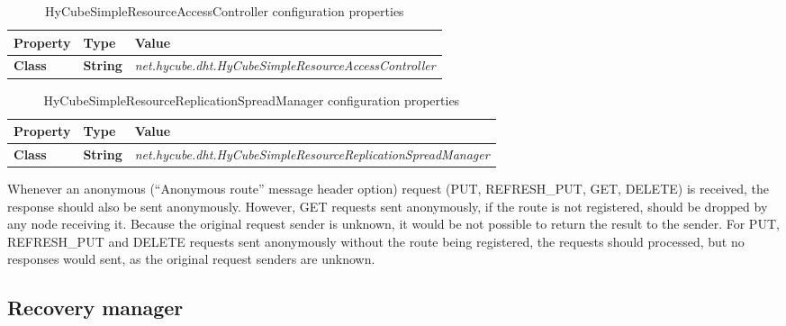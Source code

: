 \begin{table}
\scriptsize
\begin{center}
\begin{tabular}{p{5cm} p{1.5cm} p{8.0cm}}
	\hline
	\textbf{Property}						& \textbf{Type}					& \textbf{Value}					\\[1mm]
    \hline
	\textbf{Class}							& \textbf{String}				& \textit{net.hycube.dht.HyCubeSimpleResourceAccessController}									\\[1.5mm]	
    \hline
\end{tabular}
\end{center}
\caption{HyCubeSimpleResourceAccessController configuration properties}
\label{tab:libHyCubeSimpleResourceAccessController}
\end{table}

\begin{table}
\scriptsize
\begin{center}
\begin{tabular}{p{5cm} p{1.5cm} p{8.0cm}}
	\hline
	\textbf{Property}						& \textbf{Type}					& \textbf{Value}					\\[1mm]
    \hline
	\textbf{Class}							& \textbf{String}				& \textit{net.hycube.dht.HyCubeSimpleResourceReplicationSpreadManager}									\\[1.5mm]	
    \hline
\end{tabular}
\end{center}
\caption{HyCubeSimpleResourceReplicationSpreadManager configuration properties}
\label{tab:libHyCubeSimpleResourceReplicationSpreadManager}
\end{table}





Whenever an anonymous (``Anonymous route'' message header option) request (PUT, REFRESH\_PUT, GET, DELETE) is received, the response should also be sent anonymously. However, GET requests sent anonymously, if the route is not registered, should be dropped by any node receiving it. Because the original request sender is unknown, it would be not possible to return the result to the sender. For PUT, REFRESH\_PUT and DELETE requests sent anonymously without the route being registered, the requests should processed, but no responses would sent, as the original request senders are unknown.





\subsection{Recovery manager}


